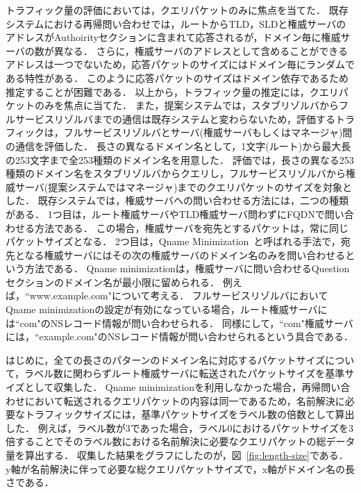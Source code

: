 トラフィック量の評価においては，クエリパケットのみに焦点を当てた．
既存システムにおける再帰問い合わせでは，ルートからTLD，SLDと権威サーバのアドレスがAuthoirityセクションに含まれて応答されるが，ドメイン毎に権威サーバの数が異なる．
さらに，権威サーバのアドレスとして含めることができるアドレスは一つでないため，応答パケットのサイズにはドメイン毎にランダムである特性がある．
このように応答パケットのサイズはドメイン依存であるため推定することが困難である．
以上から，トラフィック量の推定には，クエリパケットのみを焦点に当てた．
また，提案システムでは，スタブリゾルバからフルサービスリゾルバまでの通信は既存システムと変わらないため，評価するトラフィックは，フルサービスリゾルバとサーバ(権威サーバもしくはマネージャ)間の通信を評価した．
長さの異なるドメイン名として，1文字(ルート)から最大長の253文字まで全253種類のドメイン名を用意した．
評価では，長さの異なる253種類のドメイン名をスタブリゾルバからクエリし，フルサービスリゾルバから権威サーバ(提案システムではマネージャ)までのクエリパケットのサイズを対象とした．
既存システムでは，権威サーバへの問い合わせる方法には，二つの種類がある．
1つ目は，ルート権威サーバやTLD権威サーバ問わずにFQDNで問い合わせる方法である．
この場合，権威サーバを宛先とするパケットは，常に同じパケットサイズとなる．
2つ目は，Qname Minimization~\cite{rfc7816}と呼ばれる手法で，宛先となる権威サーバにはその次の権威サーバのドメイン名のみを問い合わせるという方法である．
Qname minimizationは，権威サーバに問い合わせるQuestionセクションのドメイン名が最小限に留められる．
例えば，``www.example.com"について考える．
フルサービスリゾルバにおいてQname minimizationの設定が有効になっている場合，ルート権威サーバには``com"のNSレコード情報が問い合わせられる．
同様にして，``com"権威サーバには，``example.com"のNSレコード情報が問い合わせられるという具合である．

はじめに，全ての長さのパターンのドメイン名に対応するパケットサイズについて，ラベル数に関わらずルート権威サーバに転送されたパケットサイズを基準サイズとして収集した．
Qname minimizationを利用しなかった場合，再帰問い合わせにおいて転送されるクエリパケットの内容は同一であるため，名前解決に必要なトラフィックサイズには，基準パケットサイズをラベル数の倍数として算出した．
例えば，ラベル数が3であった場合，ラベル0におけるパケットサイズを3倍することでそのラベル数における名前解決に必要なクエリパケットの総データ量を算出する．
収集した結果をグラフにしたのが，図~\ref{fig:length-size}である．
y軸が名前解決に伴って必要な総クエリパケットサイズで，x軸がドメイン名の長さである．

